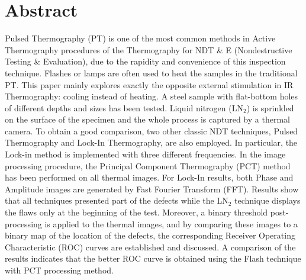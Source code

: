
\section{Abstract}
Pulsed Thermography (PT) is one of the most common methods in Active Thermography procedures of the Thermography for NDT \& E (Nondestructive Testing \& Evaluation), due to the rapidity and convenience of this inspection technique. Flashes or lamps are often used to heat the samples in the traditional PT. This paper mainly explores exactly the opposite external stimulation in IR Thermography: cooling instead of heating. A steel sample with flat-bottom holes of different depths and sizes has been tested. Liquid nitrogen (LN$_2$) is sprinkled on the surface of the specimen and the whole process is captured by a thermal camera. To obtain a good comparison, two other classic NDT techniques, Pulsed Thermography and Lock-In Thermography, are also employed. In particular, the  Lock-in  method  is  implemented  with  three  different  frequencies.  In  the  image  processing  procedure,  the Principal Component Thermography (PCT) method has been performed on all thermal images. For Lock-In results, both Phase and Amplitude images are generated by Fast Fourier Transform (FFT). Results show that all techniques presented part of the defects while the LN$_2$ technique displays the flaws only at the beginning of the test. Moreover, a binary threshold post-processing is applied to the thermal images, and by comparing these images to a binary map of the location of the defects, the corresponding Receiver Operating Characteristic (ROC) curves are established and discussed. A comparison of the results indicates that the better ROC curve is obtained using the Flash technique with PCT processing method.  

